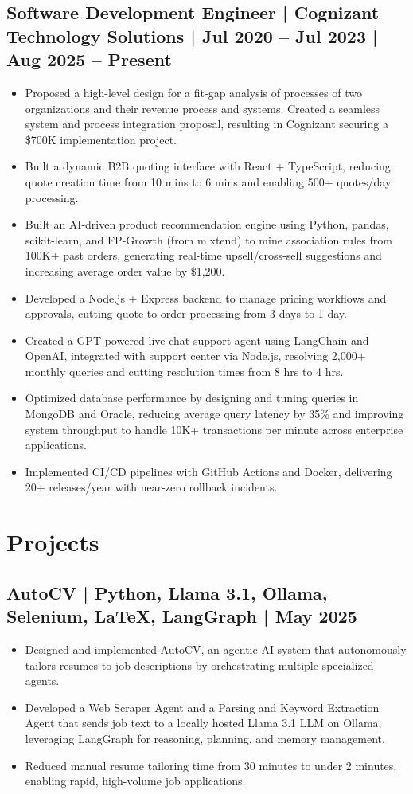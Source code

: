 \documentclass[a4paper,11pt]{article}
\begin{document}
\subsection{Software Development Engineer | Cognizant Technology Solutions | Jul 2020 – Jul 2023 | Aug 2025 – Present}
\begin{itemize}
    \item Proposed a high-level design for a fit-gap analysis of processes of two organizations and their revenue process and systems. Created a seamless system and process integration proposal, resulting in Cognizant securing a \$700K implementation project.
    \item Built a dynamic B2B quoting interface with React + TypeScript, reducing quote creation time from 10 mins to 6 mins and enabling 500+ quotes/day processing.
    \item Built an AI-driven product recommendation engine using Python, pandas, scikit-learn, and FP-Growth (from mlxtend) to mine association rules from 100K+ past orders, generating real-time upsell/cross-sell suggestions and increasing average order value by \$1,200.
    \item Developed a Node.js + Express backend to manage pricing workflows and approvals, cutting quote-to-order processing from 3 days to 1 day.
    \item Created a GPT-powered live chat support agent using LangChain and OpenAI, integrated with support center via Node.js, resolving 2,000+ monthly queries and cutting resolution times from 8 hrs to 4 hrs.
    \item Optimized database performance by designing and tuning queries in MongoDB and Oracle, reducing average query latency by 35\% and improving system throughput to handle 10K+ transactions per minute across enterprise applications.
    \item Implemented CI/CD pipelines with GitHub Actions and Docker, delivering 20+ releases/year with near-zero rollback incidents.
\end{itemize}

\section*{Projects}

\subsection{AutoCV | Python, Llama 3.1, Ollama, Selenium, LaTeX, LangGraph | May 2025}
\begin{itemize}
    \item Designed and implemented AutoCV, an agentic AI system that autonomously tailors resumes to job descriptions by orchestrating multiple specialized agents.
    \item Developed a Web Scraper Agent and a Parsing and Keyword Extraction Agent that sends job text to a locally hosted Llama 3.1 LLM on Ollama, leveraging LangGraph for reasoning, planning, and memory management.
    \item Reduced manual resume tailoring time from 30 minutes to under 2 minutes, enabling rapid, high-volume job applications.
\end{itemize}
\end{document}
